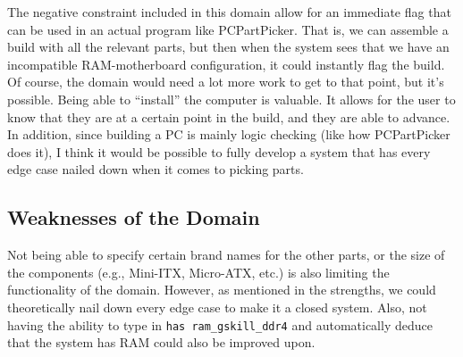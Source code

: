 \documentclass[12pt]{article}
\begin{document}
The negative constraint included in this domain allow for an immediate flag that can be used in an actual program like PCPartPicker. That is, we can assemble a build with all the relevant parts, but then when the system sees that we have an incompatible RAM-motherboard configuration, it could instantly flag the build. Of course, the domain would need a lot more work to get to that point, but it's possible. Being able to ``install'' the computer is valuable. It allows for the user to know that they are at a certain point in the build, and they are able to advance. In addition, since building a PC is mainly logic checking (like how PCPartPicker does it), I think it would be possible to fully develop a system that has every edge case nailed down when it comes to picking parts. 

\subsection{Weaknesses of the Domain}

Not being able to specify certain brand names for the other parts, or the size of the components (e.g., Mini-ITX, Micro-ATX, etc.) is also limiting the functionality of the domain. However, as mentioned in the strengths, we could theoretically nail down every edge case to make it a closed system. Also, not having the ability to type in \texttt{has ram\_gskill\_ddr4} and automatically deduce that the system has RAM could also be improved upon.
\end{document}
